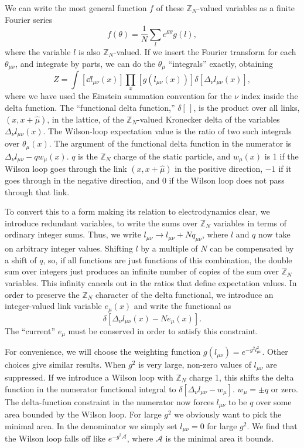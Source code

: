 We can write the most general function $f$ of these $\mathbb Z_N$-valued
variables as a finite Fourier series
\begin{equation*}
  f(\theta)=\frac1N\sum_l e^{\ii l\theta}g(l),
\end{equation*}
where the variable $l$ is also $\mathbb Z_N$-valued. If we insert the Fourier
transform for each $\theta_{\mu\nu}$, and integrate by parts, we can do the
$\theta_\mu$ ``integrals'' exactly, obtaining
\begin{equation*}
  Z=\int[\dd l_{\mu\nu}(x)]\prod_x[g(l_{\mu\nu}(x))]
  \delta[\Delta_\nu l_{\mu\nu}(x)],
\end{equation*}
where we have used the Einstein summation convention for the $\nu$ index inside
the delta function. The ``functional delta function,'' $\delta[\,]$, is the
product over all links, $(x,x+\hat\mu)$, in the lattice, of the
$\mathbb Z_N$-valued Kronecker delta of the variables
$\Delta_\nu l_{\mu\nu}(x)$. The Wilson-loop expectation value is the ratio of
two such integrals over $\theta_\mu(x)$. The argument of the functional delta
function in the numerator is $\Delta_\nu l_{\mu\nu}-qw_\mu(x)$. $q$ is the
$\mathbb Z_N$ charge of the static particle, and $w_\mu(x)$ is 1 if the Wilson
loop goes through the link $(x,x+\hat\mu)$ in the positive direction, $-1$ if
it goes through in the negative direction, and 0 if the Wilson loop does not
pass through that link.

To convert this to a form making its relation to electrodynamics clear, we
introduce redundant variables, to write the sums over $\mathbb Z_N$ variables
in terms of ordinary integer sums. Thus, we write
$l_{\mu\nu}\to l_{\mu\nu}+Nq_{\mu\nu}$, where $l$ and $q$ now take on arbitrary
integer values. Shifting $l$ by a multiple of $N$ can be compensated by a shift
of $q$, so, if all functions are just functions of this combination, the double
sum over integers just produces an infinite number of copies of the sum over
$\mathbb Z_N$ variables. This infinity cancels out in the ratios that define
expectation values. In order to preserve the $\mathbb Z_N$ character of the
delta functional, we introduce an integer-valued link variable $e_\mu(x)$ and
write the functional as
\begin{equation*}
  \delta[\Delta_\nu l_{\mu\nu}(x)-Ne_\mu(x)].
\end{equation*}
The ``current'' $e_\mu$ must be conserved in order to satisfy this constraint.

For convenience, we will choose the weighting function
$g(l_{\mu\nu})=e^{-g^2l_{\mu\nu}^2}$. Other choices give similar results. When
$g^2$ is very large, non-zero values of $l_{\mu\nu}$ are suppressed. If we
introduce a Wilson loop with $\mathbb Z_N$ charge 1, this shifts the delta
function in the numerator functional integral to
$\delta[\Delta_\nu l_{\mu\nu}-w_\mu]$. $w_\mu=\pm q$ or zero. The delta-function
constraint in the numerator now forces $l_{\mu\nu}$ to be $q$ over some area
bounded by the Wilson loop. For large $g^2$ we obviously want to pick the
minimal area. In the denominator we simply set $l_{\mu\nu}=0$ for large $g^2$.
We find that the Wilson loop falls off like $e^{-g^2\mathcal A}$, where
$\mathcal A$ is the minimal area it bounds.

